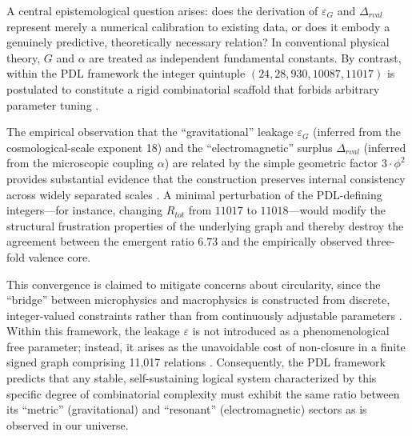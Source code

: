 \documentclass[11pt,a4paper]{article}
\begin{document}
A central epistemological question arises: does the derivation of $\varepsilon_G$ and $\Delta_{rval}$ represent merely a numerical calibration to existing data, or does it embody a genuinely predictive, theoretically necessary relation? In conventional physical theory, $G$ and $\alpha$ are treated as independent fundamental constants. By contrast, within the PDL framework the integer quintuple $(24, 28, 930, 10087, 11017)$ is postulated to constitute a rigid combinatorial scaffold that forbids arbitrary parameter tuning \cite{PDL_Main_2026, PDL_Global_Mapping_2026}.

The empirical observation that the “gravitational” leakage $\varepsilon_G$ (inferred from the cosmological-scale exponent 18) and the “electromagnetic” surplus $\Delta_{rval}$ (inferred from the microscopic coupling $\alpha$) are related by the simple geometric factor $3 \cdot \phi^2$ provides substantial evidence that the construction preserves internal consistency across widely separated scales \cite{Exponent_18_PDL_2026}. A minimal perturbation of the PDL-defining integers—for instance, changing $R_{tot}$ from $11017$ to $11018$—would modify the structural frustration properties of the underlying graph and thereby destroy the agreement between the emergent ratio $6.73$ and the empirically observed three-fold valence core.

This convergence is claimed to mitigate concerns about circularity, since the “bridge” between microphysics and macrophysics is constructed from discrete, integer-valued constraints rather than from continuously adjustable parameters \cite{Topological_Reformulation_PDL_2026}. Within this framework, the leakage $\varepsilon$ is not introduced as a phenomenological free parameter; instead, it arises as the unavoidable cost of non-closure in a finite signed graph comprising 11,017 relations \cite{Exponent_18_PDL_2026}. Consequently, the PDL framework predicts that any stable, self-sustaining logical system characterized by this specific degree of combinatorial complexity must exhibit the same ratio between its “metric” (gravitational) and “resonant” (electromagnetic) sectors as is observed in our universe.
\end{document}

